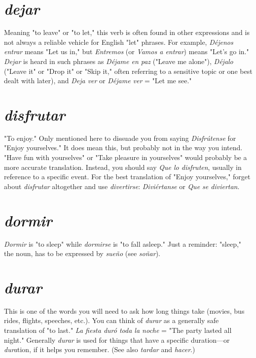 \documentclass[14pt,a4paper,oneside]{memoir}
\begin{document}
\section{\emph{dejar}}

Meaning "to leave" or "to let," this verb is often found in
other expressions and is not always a reliable vehicle for English "let"
phrases. For example, \emph{Déjenos entrar} means "Let us in," but \emph{Entremos}
(or \emph{Vamos a entrar}) means "Let's go in." \emph{Dejar} is heard in such phrases
as \emph{Déjame en paz} ("Leave me alone"), \emph{Déjalo} ("Leave it" or "Drop it"
or "Skip it," often referring to a sensitive topic or one best dealt with
later), and \emph{Deja ver} or \emph{Déjame ver} = "Let me see."

\section{\emph{disfrutar}}

"To enjoy." Only mentioned here to dissuade you from saying
\emph{Disfrútense} for "Enjoy yourselves." It does mean this, but probably not
in the way you intend. "Have fun with yourselves" or "Take pleasure
in yourselves" would probably be a more accurate translation. Instead,
you should say \emph{Que lo disfruten}, usually in reference to a specific
event. For the best translation of "Enjoy yourselves," forget about \emph{disfrutar} altogether and use \emph{divertirse}: \emph{Diviértanse} or \emph{Que se diviertan}.

\section{\emph{dormir}}

\emph{Dormir} is "to sleep" while \emph{dormirse} is "to fall asleep." Just a
reminder: "sleep," the noun, has to be expressed by \emph{sueño} (see \emph{soñar}).

\section{\emph{durar}}

This is one of the words you will need to ask how long things
take (movies, bus rides, flights, speeches, etc.). You can think of \emph{durar}
as a generally safe translation of "to last." \emph{La fiesta duró toda la noche}
= "The party lasted all night." Generally \emph{durar} is used for things that
have a specific duration---or \emph{dura}tion, if it helps you remember. (See
also \emph{tardar} and \emph{hacer}.)
\end{document}
